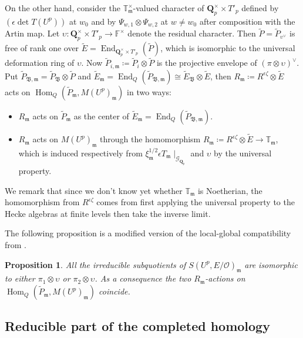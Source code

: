 \documentclass[leqno]{amsart}
\newtheorem{prop}[thm]{Proposition}
\theoremstyle{definition}
\theoremstyle{remark}
\newcommand{\oo}{\mathcal{O}}
\newcommand{\fF}{\mathbb{F}} %
\newcommand{\Qp}{\mathbf{Q}_p}
\DeclareMathOperator{\End}{End}
\DeclareMathOperator{\Hom}{Hom}
\newcommand{\fm}{\mathfrak{m}}
\newcommand{\Gp}{\mathcal{G}_{\Qp}} %
\newcommand{\B}{\mathfrak B} %
\newcommand{\TT}{\mathbb{T}} %
\begin{document}
On the other hand, consider the $\TT_\fm^\times$-valued character 
of $\Qp^\times\times T'_p$ defined by 
$(\epsilon\det T(U^p))$ at $w_0$
and by $\Psi_{w,1}\otimes\Psi_{w,2}$ at $w\neq w_0$
after composition with the Artin map.
Let $\upsilon\colon\Qp^\times\times T'_p\to\fF^\times$
denote the residual character.
Then $\tilde{P}=\tilde{P}_{\upsilon^\vee}$ is free of rank one over
$\tilde{E}=\End_{\Qp^\times\times T'_p}(\tilde{P})$,
which is isomorphic to the universal deformation ring of $\upsilon$.
Now $\tilde{P}_{i,\fm}\coloneqq\tilde{P}_i\otimes \tilde{P}$
is the projective envelope of $(\pi\otimes\upsilon)^\vee$.
Put $\tilde{P}_{\B,\fm}=\tilde{P}_\B\otimes \tilde{P}$ and 
$\tilde{E}_\fm=\End_{Q}(\tilde{P}_{\B,\fm})\cong 
\tilde{E}_\B\otimes \tilde{E}$,
then $R_\fm\coloneqq R^{\epsilon\zeta}\otimes \tilde{E}$
acts on $\Hom_{Q}(\tilde{P}_\fm, M(U^p)_\fm)$ in two ways:



\begin{itemize}
\item $R_\fm$ acts on $\tilde{P}_\fm$ as the center of 
$\tilde{E}_\fm=\End_{Q}(\tilde{P}_{\B,\fm})$.
\item $R_\fm$ acts on $M(U^p)_\fm$ through the homomorphism
$R_\fm\coloneqq R^{\epsilon\zeta}\otimes \tilde{E}\to \TT_\fm$, which is
induced respectively from $\xi_\fm^{1/2}\epsilon {T_\fm}\mid_{\Gp}$
and $\upsilon$ by the universal property.

\end{itemize}
We remark that since we don't know yet whether $\TT_\fm$ is Noetherian,
the homomorphism from $R^{\epsilon\zeta}$ comes from 
first applying the universal property to the Hecke algebras at finite
levels then take the inverse limit.

The following proposition is a modified version of
the local-global compatibility from \cite{pan}.

\begin{prop}\label{prop:compatibility}
    All the irreducible subquotients of $S(U^p,E/\oo)_\fm$
    are isomorphic to either $\pi_1\otimes\upsilon$ or 
    $\pi_2\otimes\upsilon$. 
    As a consequence the two $R_\fm$-actions on 
    $\Hom_{Q}(\tilde{P}_\fm, M(U^p)_\fm)$ coincide.
\end{prop}

\subsection{Reducible part of the completed homology}
\end{document}

